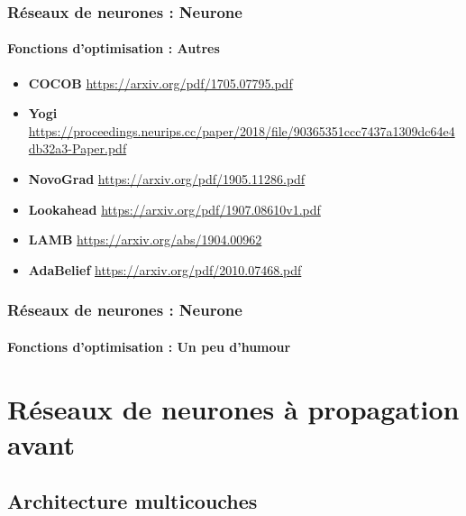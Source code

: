 \documentclass[xcolor=table]{beamer}
\begin{document}
\begin{frame}
	\frametitle{Réseaux de neurones : Neurone}
	\framesubtitle{Fonctions d'optimisation : Autres}
	
	\begin{itemize}
		\item \textbf{COCOB} \cite{orabona2017training} {\scriptsize \url{https://arxiv.org/pdf/1705.07795.pdf}}
		
		\item \textbf{Yogi} \cite{zaheer2018adaptive} {\scriptsize \url{https://proceedings.neurips.cc/paper/2018/file/90365351ccc7437a1309dc64e4db32a3-Paper.pdf}}
		
		\item \textbf{NovoGrad} \cite{ginsburg2019training} {\scriptsize \url{https://arxiv.org/pdf/1905.11286.pdf}} 
		
		\item \textbf{Lookahead} \cite{10.5555/3454287.3455148} {\scriptsize \url{https://arxiv.org/pdf/1907.08610v1.pdf}} 
		
		\item \textbf{LAMB} \cite{you2020large} {\scriptsize \url{https://arxiv.org/abs/1904.00962}} 
		
		\item \textbf{AdaBelief} \cite{zhuang2020adabelief} {\scriptsize \url{https://arxiv.org/pdf/2010.07468.pdf}}
		
		
	\end{itemize}
	
\end{frame}

\begin{frame}
	\frametitle{Réseaux de neurones : Neurone}
	\framesubtitle{Fonctions d'optimisation : Un peu d'humour}
	
	\begin{center}
	\end{center}
	
\end{frame}

\section{Réseaux de neurones à propagation avant}

\subsection{Architecture multicouches}
\end{document}
